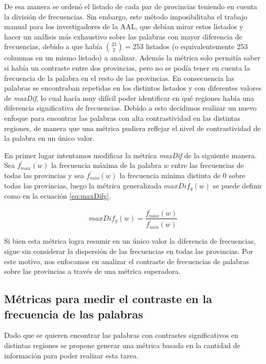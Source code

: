 De esa manera se ordenó el listado de cada par de provincias teniendo en cuenta la división de frecuencias. 
Sin embargo, este método imposibilitaba el trabajo manual para los investigadores de la AAL, que debían mirar estos listados y hacer un análisis más exhaustivo sobre las palabras con mayor diferencia de frecuencias, debido a que había $\binom{23}{2} = 253$
listados (o equivalentemente 253 columnas en un mismo listado) a analizar. Además la métrica solo permitía saber si había un contraste entre dos provincias, pero no se podía tener en cuenta la frecuencia de la palabra en el resto de las provincias. 
En consecuencia las palabras se encontraban repetidas en los distintos listados y con diferentes valores de \textit{maxDif}, lo cual hacía muy difícil poder identificar en qué regiones había una diferencia significativa de frecuencias.
Debido a esto decidimos realizar un nuevo enfoque para encontrar las palabras con alta contrastividad en las distintas regiones, de manera que una métrica pudiera reflejar el nivel de contrastividad de la palabra en un único valor. 

En primer lugar intentamos modificar la métrica \textit{maxDif} de la siguiente manera. 
Sea $f_{max}^\prime(w)$ la frecuencia máxima de la palabra $w$ entre las frecuencias de todas las provincias y sea $f_{min}^\prime(w)$ la frecuencia mínima distinta de $0$ sobre todas las provincias, luego la métrica generalizada \textit{$maxDif_g(w)$} se puede definir como en la ecuación \ref{eq:maxDifg}.

\begin{equation}
 maxDif_g(w) = \frac{f_{max}^\prime(w)}{f_{min}^\prime(w)}
 \label{eq:maxDifg}  
\end{equation} 

Si bien esta métrica logra resumir en un único valor la diferencia de frecuencias, sigue sin considerar la dispersión de las frecuencias en todas las provincias.
Por este motivo, nos enfocamos en analizar el contraste de frecuencias de palabras sobre las provincias a través de una métrica superadora.

\subsection{Métricas para medir el contraste en la frecuencia de las palabras}
Dado que se quieren encontrar las palabras con contrastes significativos en distintas 
regiones se propone generar una métrica basada en la cantidad de información 
para poder realizar esta tarea.

